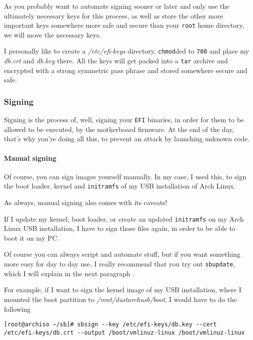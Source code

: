 \documentclass[10pt]{dustdoc}
\begin{document}
As you probably want to automate signing sooner or later and only use the ultimately necessary keys for this process, as well as store the other more important keys somewhere more safe and secure than your \texttt{root} home directory, we will move the necessary keys.

I personally like to create a \textit{/etc/efi-keys} directory, \texttt{chmod}ded to \texttt{700} and place my \textit{db.crt} and \textit{db.key} there.
All the keys will get packed into a \texttt{tar} archive and encrypted with a strong symmetric pass phrase and stored somewhere secure and safe.

\subsubsection{Signing}
\label{sec:signing}

Signing is the process of, well, signing your \texttt{EFI} binaries, in order for them to be allowed to be executed, by the motherboard firmware.
At the end of the day, that’s why you’re doing all this, to prevent an attack by launching unknown code.

\paragraph{Manual signing}
\label{par:manual-signing}

Of course, you can sign images yourself manually.
In my case, I used this, to sign the boot loader, kernel and \texttt{initramfs} of my USB installation of Arch Linux.

\begin{NOTE}
    As always, manual signing also comes with its caveats!

    If I update my kernel, boot loader, or create an updated \texttt{initramfs} on my Arch Linux USB installation, I have to sign those files again, in order to be able to boot it on my PC.

    Of course you can always script and automate stuff, but if you want something more easy for day to day use, I really recommend that you try out \texttt{sbupdate},  which I will explain in the next paragraph .
\end{NOTE}

For example, if I want to sign the kernel image of my USB installation, where I mounted the boot partition to \textit{/mnt/dustarchusb/boot}, I would have to do the following

\begin{verbatim}
[root@archiso ~/sb]# sbsign --key /etc/efi-keys/db.key --cert /etc/efi-keys/db.crt --output /boot/vmlinuz-linux /boot/vmlinuz-linux
\end{verbatim}
\end{document}
